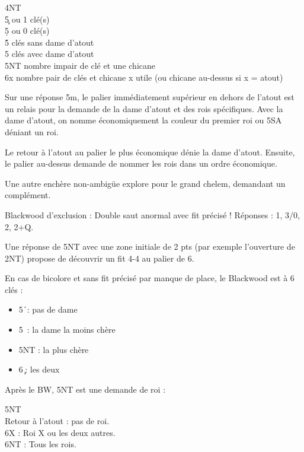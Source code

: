 \documentclass[a4paper]{article}
\begin{document}
\begin{bidtable}
4NT\+\\
5\c {} ou 1 clé(s)\\
5\d {} ou 0 clé(s)\\
5\h {} clés sans dame d'atout\\
5\s {} clés avec dame d'atout\\
5NT \> nombre impair de clé et une chicane\\
6x \> nombre pair de clés et chicane x utile (ou chicane au-dessus si x = atout)\-
\end{bidtable}

Sur une réponse 5m, le palier immédiatement supérieur en dehors de l'atout est un relais pour la demande de la dame d'atout et des rois spécifiques.
Avec la dame d'atout, on nomme économiquement la couleur du premier roi ou 5SA déniant un roi.

Le retour à l'atout au palier le plus économique dénie la dame d'atout. Ensuite, le palier au-dessus demande de nommer les rois dans un ordre économique.

Une autre enchère non-ambigüe explore pour le grand chelem, demandant un complément.

Blackwood d'exclusion : Double saut anormal avec fit précisé ! 
Réponses : 1, 3/0, 2, 2+Q.

Une réponse de 5NT avec une zone initiale de 2 pts (par exemple l'ouverture de 2NT) propose de découvrir un fit 4-4 au palier de 6.

En cas de bicolore et sans fit précisé par manque de place, le Blackwood est à 6 clés :

\begin{itemize}
\item 5\h\ : pas de dame

\item 5\s\ : la dame la moins chère

\item 5NT : la plus chère

\item 6\c\ : les deux

\end{itemize}

Après le BW, 5NT est une demande de roi :

\begin{bidtable}
5NT\+\\
Retour \> à l'atout : pas de roi.\\
6X \> : Roi X ou les deux autres.\\
6NT \> : Tous les rois.\-
\end{bidtable}
\end{document}
